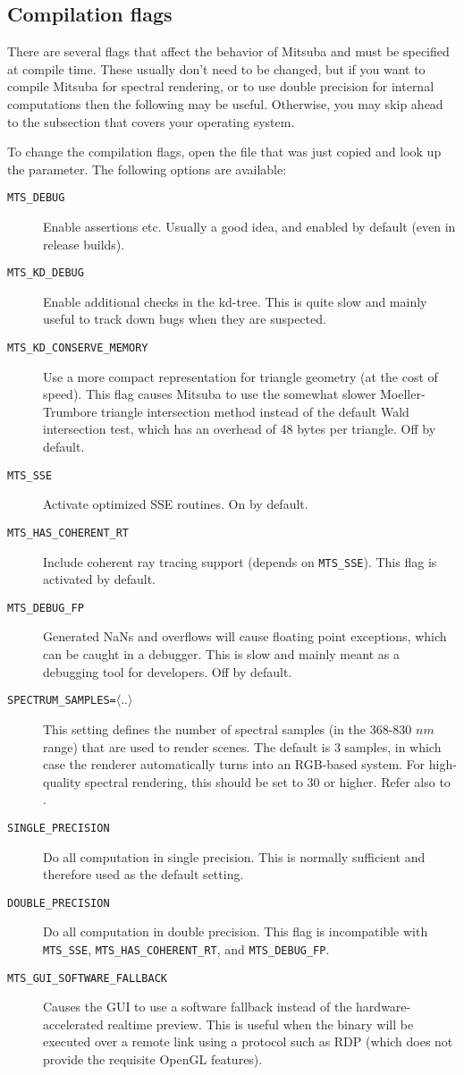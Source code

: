 \subsection{Compilation flags}
\label{sec:compiling-flags}
There are several flags that affect the behavior of Mitsuba and must be specified at compile time.
These usually don't need to be changed, but if you want to compile Mitsuba for spectral rendering, or 
to use double precision for internal computations then the following may be useful. Otherwise, you may skip ahead to the subsection
that covers your operating system.

To change the compilation flags, open the  file that was just copied and look up the  parameter.
The following options are available:
\begin{description}
\item[\texttt{MTS\_DEBUG}] Enable assertions etc. Usually a good idea, and
enabled by default (even in release builds).
\item[\texttt{MTS\_KD\_DEBUG}] Enable additional checks in the kd-tree. This
is quite slow and mainly useful to track down bugs when they are suspected.
\item[\texttt{MTS\_KD\_CONSERVE\_MEMORY}] Use a more compact representation 
for triangle geometry (at the cost of speed). This flag causes Mitsuba to use the somewhat slower
Moeller-Trumbore triangle intersection method instead of the default Wald
intersection test, which has an overhead of 48 bytes per triangle.
Off by default.
\item[\texttt{MTS\_SSE}]Activate optimized SSE routines. On by default.
\item[\texttt{MTS\_HAS\_COHERENT\_RT}]Include coherent ray tracing support (depends on \texttt{MTS\_SSE}). This flag is activated by default. 
\item[\texttt{MTS\_DEBUG\_FP}]Generated NaNs and overflows will cause floating point exceptions, which can be caught in a debugger. This is slow and mainly meant as a debugging tool for developers. Off by default.
\item[\texttt{SPECTRUM\_SAMPLES=}$\langle ..\rangle$]This setting defines the number of spectral samples (in the 368-830 $nm$ range) that are used to render scenes. The default is 3 samples, in which case the renderer automatically turns into an RGB-based system. For high-quality spectral rendering, this should be set to 30 or higher.
Refer also to .
\item[\texttt{SINGLE\_PRECISION}] Do all computation in single precision. This is normally sufficient and therefore used as the default setting.
\item[\texttt{DOUBLE\_PRECISION}] Do all computation in double precision. This flag is incompatible with
\texttt{MTS\_SSE}, \texttt{MTS\_HAS\_COHERENT\_RT}, and \texttt{MTS\_DEBUG\_FP}.
\item[\texttt{MTS\_GUI\_SOFTWARE\_FALLBACK}]Causes the GUI to use a software
fallback instead of the hardware-accelerated realtime preview.
This is useful when the binary will be executed over a remote link using a
protocol such as RDP (which does not provide the requisite OpenGL features).
\end{description}
